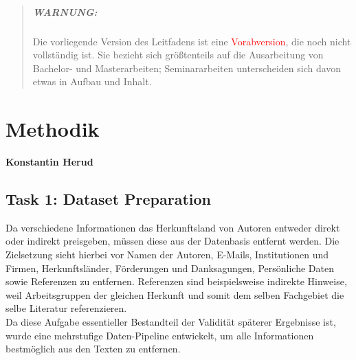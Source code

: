 \documentclass[bachelor,german]{info1thesis}
\begin{document}
\begin{abstract}
    \paragraph{WARNUNG:} 
    Die vorliegende Version des Leitfadens ist eine \textcolor{red}{Vorabversion}, die noch nicht vollständig ist.
    Sie bezieht sich größtenteils auf die Ausarbeitung von Bachelor- und Masterarbeiten; Seminararbeiten unterscheiden sich davon etwas in Aufbau und Inhalt.

\end{abstract}

\thesistableofcontents







\chapter{Methodik}
\textbf{Konstantin Herud} \\

\section{Task 1: Dataset Preparation}

Da verschiedene Informationen das Herkunftsland von Autoren entweder direkt oder indirekt preisgeben, müssen diese aus der Datenbasis entfernt werden. Die Zielsetzung sieht hierbei vor
Namen der Autoren,
E-Mails,
Institutionen und Firmen,
Herkunftsländer,
Förderungen und Danksagungen,
Persönliche Daten
sowie Referenzen
zu entfernen.
Referenzen sind beispielsweise indirekte Hinweise, weil Arbeitsgruppen der gleichen Herkunft und somit dem selben Fachgebiet die selbe Literatur referenzieren. \\
Da diese Aufgabe essentieller Bestandteil der Validität späterer Ergebnisse ist, wurde eine mehrstufige Daten-Pipeline entwickelt, um alle Informationen bestmöglich aus den Texten zu entfernen.
\end{document}
